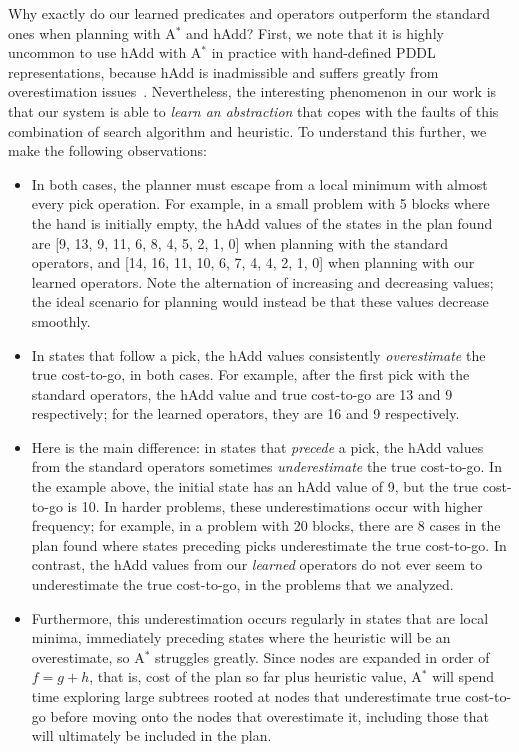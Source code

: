 Why exactly do our learned predicates and operators outperform the standard ones when planning with A$^*$ and hAdd? First, we note that it is highly uncommon to use hAdd with A$^*$ in practice with hand-defined PDDL representations, because hAdd is inadmissible and suffers greatly from overestimation issues~\cite{bonet2001planning}. Nevertheless, the interesting phenomenon in our work is that our system is able to \emph{learn an abstraction} that copes with the faults of this combination of search algorithm and heuristic. To understand this further, we make the following observations:
\begin{itemize}
    \item In both cases, the planner must escape from a local minimum with almost every pick operation. For example, in a small problem with 5 blocks where the hand is initially empty, the hAdd values of the states in the plan found are [9, 13, 9, 11, 6, 8, 4, 5, 2, 1, 0] when planning with the standard operators, and [14, 16, 11, 10, 6, 7, 4, 4, 2, 1, 0] when planning with our learned operators. Note the alternation of increasing and decreasing values; the ideal scenario for planning would instead be that these values decrease smoothly.
    \item In states that follow a pick, the hAdd values consistently \emph{overestimate} the true cost-to-go, in both cases. For example, after the first pick with the standard operators, the hAdd value and true cost-to-go are 13 and 9 respectively; for the learned operators, they are 16 and 9 respectively.
    \item Here is the main difference: in states that \emph{precede} a pick, the hAdd values from the standard operators sometimes \emph{underestimate} the true cost-to-go. In the example above, the initial state has an hAdd value of 9, but the true cost-to-go is 10. In harder problems, these underestimations occur with higher frequency; for example, in a problem with 20 blocks, there are 8 cases in the plan found where states preceding picks underestimate the true cost-to-go. In contrast, the hAdd values from our \emph{learned} operators do not ever seem to underestimate the true cost-to-go, in the problems that we analyzed.
    \item Furthermore, this underestimation occurs regularly in states that are local minima, immediately preceding states where the heuristic will be an overestimate, so A$^*$ struggles greatly. Since nodes are expanded in order of $f = g + h$, that is, cost of the plan so far plus heuristic value, A$^*$ will spend time exploring large subtrees rooted at nodes that underestimate true cost-to-go before moving onto the nodes that overestimate it, including those that will ultimately be included in the plan.
\end{itemize}

